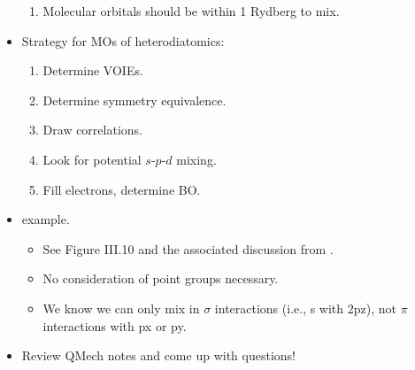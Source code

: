 \documentclass[../notes.tex]{subfiles}
\begin{document}
\begin{itemize}
\begin{enumerate}
        \item Molecular orbitals should be within 1 Rydberg to mix.
    \end{enumerate}
    \item Strategy for MOs of heterodiatomics:
    \begin{enumerate}
        \item Determine VOIEs.
        \item Determine symmetry equivalence.
        \item Draw correlations.
        \item Look for potential $s$-$p$-$d$ mixing.
        \item Fill electrons, determine BO.
    \end{enumerate}
    \item {} example.
    \begin{itemize}
        \item See Figure III.10 and the associated discussion from \textcite{bib:CHEM20100Notes}.
        \item No consideration of point groups necessary.
        \item We know we can only mix in $\sigma$ interactions (i.e., s with 2pz), not $\pi$ interactions with px or py.
    \end{itemize}
    \item Review QMech notes and come up with questions!
\end{itemize}
\end{document}
